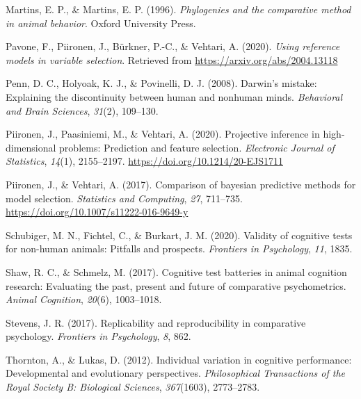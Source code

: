 \documentclass[
  man,floatsintext]{apa6}
\newlength{\cslhangindent}
\newlength{\cslentryspacingunit} %
\newenvironment{CSLReferences}[2] %
 {%
  \setlength{\parindent}{0pt}
  \ifodd #1
  \let\oldpar\par
  \def\par{\hangindent=\cslhangindent\oldpar}
  \fi
  \setlength{\parskip}{#2\cslentryspacingunit}
 }%
 {}
\begin{document}
\begin{CSLReferences}{1}{0}
\leavevmode{}%
Martins, E. P., \& Martins, E. P. (1996). \emph{Phylogenies and the comparative method in animal behavior}. Oxford University Press.

\leavevmode{}%
Pavone, F., Piironen, J., Bürkner, P.-C., \& Vehtari, A. (2020). \emph{Using reference models in variable selection}. Retrieved from \url{https://arxiv.org/abs/2004.13118}

\leavevmode{}%
Penn, D. C., Holyoak, K. J., \& Povinelli, D. J. (2008). Darwin's mistake: Explaining the discontinuity between human and nonhuman minds. \emph{Behavioral and Brain Sciences}, \emph{31}(2), 109--130.

\leavevmode{}%
Piironen, J., Paasiniemi, M., \& Vehtari, A. (2020). {Projective inference in high-dimensional problems: Prediction and feature selection}. \emph{Electronic Journal of Statistics}, \emph{14}(1), 2155--2197. \url{https://doi.org/10.1214/20-EJS1711}

\leavevmode{}%
Piironen, J., \& Vehtari, A. (2017). Comparison of bayesian predictive methods for model selection. \emph{Statistics and Computing}, \emph{27}, 711--735. \url{https://doi.org/10.1007/s11222-016-9649-y}

\leavevmode{}%
Schubiger, M. N., Fichtel, C., \& Burkart, J. M. (2020). Validity of cognitive tests for non-human animals: Pitfalls and prospects. \emph{Frontiers in Psychology}, \emph{11}, 1835.

\leavevmode{}%
Shaw, R. C., \& Schmelz, M. (2017). Cognitive test batteries in animal cognition research: Evaluating the past, present and future of comparative psychometrics. \emph{Animal Cognition}, \emph{20}(6), 1003--1018.

\leavevmode{}%
Stevens, J. R. (2017). Replicability and reproducibility in comparative psychology. \emph{Frontiers in Psychology}, \emph{8}, 862.

\leavevmode{}%
Thornton, A., \& Lukas, D. (2012). Individual variation in cognitive performance: Developmental and evolutionary perspectives. \emph{Philosophical Transactions of the Royal Society B: Biological Sciences}, \emph{367}(1603), 2773--2783.


\end{CSLReferences}
\end{document}
